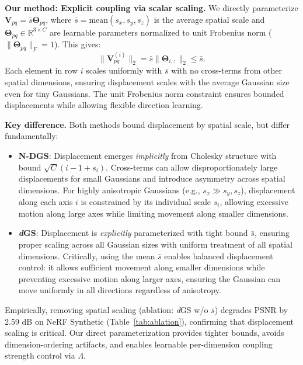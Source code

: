 \documentclass{article}
\newcommand{\modelname}{\textit{d}GS}
\theoremstyle{plain}
\theoremstyle{definition}
\theoremstyle{remark}
\begin{document}
\textbf{Our method: Explicit coupling via scalar scaling.} We directly parameterize $\mathbf{V}_{pq} = \bar{s} \boldsymbol{\Theta}_{pq}$, where $\bar{s} = \text{mean}(s_x, s_y, s_z)$ is the average spatial scale and $\boldsymbol{\Theta}_{pq} \in \mathbb{R}^{3 \times C}$ are learnable parameters normalized to unit Frobenius norm ($\|\boldsymbol{\Theta}_{pq}\|_F = 1$). This gives:
\begin{equation}
\|\mathbf{V}_{pq}^{(i)}\|_2 = \bar{s} \|\boldsymbol{\Theta}_{i,:}\|_2 \leq \bar{s}.
\end{equation}
Each element in row $i$ scales uniformly with $\bar{s}$ with no cross-terms from other spatial dimensions, ensuring displacement scales with the average Gaussian size even for tiny Gaussians. The unit Frobenius norm constraint ensures bounded displacements while allowing flexible direction learning.

\textbf{Key difference.} Both methods bound displacement by spatial scale, but differ fundamentally:
\begin{itemize}[leftmargin=*]
\item \textbf{N-DGS}: Displacement emerges \textit{implicitly} from Cholesky structure with bound $\sqrt{C}(i-1 + s_i)$. Cross-terms can allow disproportionately large displacements for small Gaussians and introduce asymmetry across spatial dimensions. For highly anisotropic Gaussians (e.g., $s_x \gg s_y, s_z$), displacement along each axis $i$ is constrained by its individual scale $s_i$, allowing excessive motion along large axes while limiting movement along smaller dimensions.
\item \textbf{\modelname{}}: Displacement is \textit{explicitly} parameterized with tight bound $\bar{s}$, ensuring proper scaling across all Gaussian sizes with uniform treatment of all spatial dimensions. Critically, using the mean $\bar{s}$ enables balanced displacement control: it allows sufficient movement along smaller dimensions while preventing excessive motion along larger axes, ensuring the Gaussian can move uniformly in all directions regardless of anisotropy.
\end{itemize}

Empirically, removing spatial scaling (ablation: \textit{d}GS w/o $\bar{s}$) degrades PSNR by 2.59 dB on NeRF Synthetic (Table~\ref{tab:ablation}), confirming that displacement scaling is critical. Our direct parameterization provides tighter bounds, avoids dimension-ordering artifacts, and enables learnable per-dimension coupling strength control via $\Lambda$.
\end{document}
